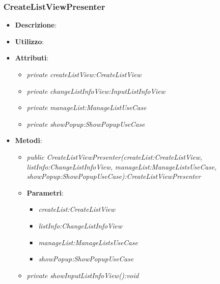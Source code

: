 \subsubsection{CreateListViewPresenter}
\begin{itemize}
\item \textbf{Descrizione}: 
\item \textbf{Utilizzo}:
\item \textbf{Attributi}: 
	\begin{itemize}
	\item \textit{private createListView:CreateListView}\\
	
	\item \textit{private changeListInfoView:InputListInfoView}\\
	
	\item \textit{private manageList:ManageListUseCase}\\
	
	\item \textit{private showPopup:ShowPopupUseCase}\\
	
	\end{itemize}
\item \textbf{Metodi}:
	\begin{itemize}
	\item \textit{public CreateListViewPresenter(createList:CreateListView, listInfo:ChangeListInfoView, manageList:ManageListsUseCase, showPopup:ShowPopupUseCase):CreateListViewPresenter}\\
	
		\item{\textbf{Parametri}: \begin{itemize}
		\item \textit{createList:CreateListView}\\
		
		\item \textit{listInfo:ChangeListInfoView}\\
		
		\item \textit{manageList:ManageListsUseCase}\\
		
		\item \textit{showPopup:ShowPopupUseCase}\\
		
		\end{itemize}}
	\item \textit{private showInputListInfoView():void}\\
	 

\end{itemize}
\end{itemize}
